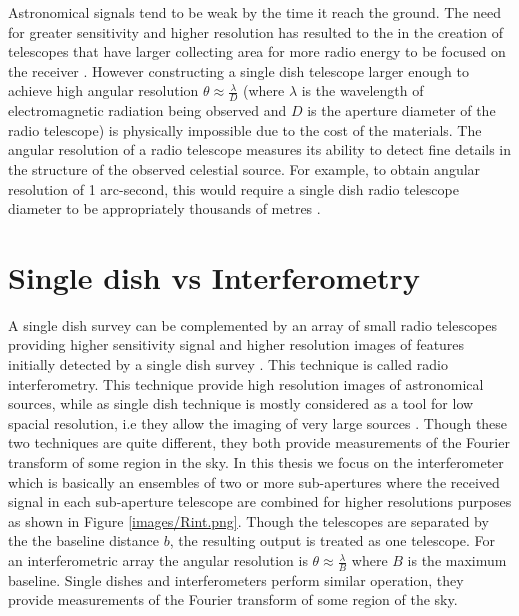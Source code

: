 Astronomical signals tend to be weak by the time it reach the ground. The need for greater sensitivity and higher resolution has resulted to the in the creation of telescopes that have larger collecting area for more radio energy to be focused on the receiver \citep{verschuur2015invisible}. However constructing a single dish telescope larger enough to achieve high angular resolution $\theta \approx\frac{\lambda}{D}$ (where $\lambda$ is the wavelength of electromagnetic radiation  being observed and $D$ is the aperture diameter of the radio telescope) is physically impossible due to the cost of the materials. The angular resolution of a radio telescope measures its ability to detect fine details in the structure of the observed celestial source. For example, to obtain angular resolution of 1 arc-second, this would require a single dish radio telescope diameter to be appropriately thousands of metres \citep{verschuur2015invisible}. 

\section{Single dish vs Interferometry}
\label{RvI}


A single dish survey can be complemented by an array of small radio telescopes providing higher sensitivity signal and higher resolution images of features initially detected by a single dish survey \citep{wright2004single}. This technique is called radio interferometry. This technique provide high resolution images of astronomical sources, while as single dish technique is mostly considered as a tool for low spacial resolution, i.e  they allow the imaging of very large sources \citep{stanimirovic2002short}. Though these two techniques are quite different, they both provide measurements of the Fourier transform of  some region in the sky. In this thesis we focus on the interferometer which is basically an ensembles of two or more sub-apertures where the received signal in each sub-aperture telescope are combined for higher resolutions purposes \citep{verschuur2015invisible} as shown in Figure \ref{images/Rint.png}. Though the telescopes are separated by the the baseline distance $b$, the resulting output is treated as one telescope. For an interferometric array the angular resolution is $\theta \approx\frac{\lambda}{B}$ where $B$ is the maximum baseline. Single dishes and interferometers  perform similar operation, they provide measurements of the Fourier transform of some region of the sky.


